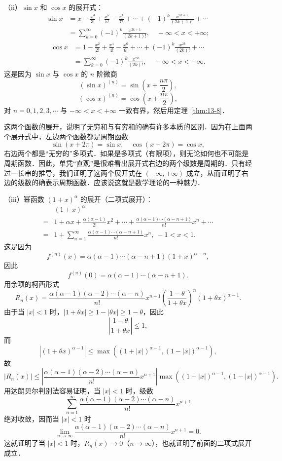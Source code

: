 （ii）$\sin x$ 和 $\cos x$ 的展开式：
\[
\begin{aligned}
\sin x&=x-\frac{x^{3}}{3!}+\frac{x^{5}}{5!}-\frac{x^{7}}{7!}+\cdots+(-1)^{k}\frac{x^{2k+1}}{(2k+1)!}+\cdots\\
&=\sum_{k=0}^{\infty}(-1)^{k}\frac{x^{2k+1}}{(2k+1)!},\quad -\infty<x<+\infty;
\end{aligned}
\]
\[
\begin{aligned}
\cos x&=1-\frac{x^{2}}{2!}+\frac{x^{4}}{4!}-\frac{x^{6}}{6!}+\cdots+(-1)^{k}\frac{x^{2k}}{(2k)!}+\cdots\\
&=\sum_{k=0}^{\infty}(-1)^{k}\frac{x^{2k}}{(2k)!},\quad -\infty<x<+\infty.
\end{aligned}
\]这是因为 $\sin x$ 与 $\cos x$ 的 $n$ 阶微商
\[
(\sin x)^{(n)}=\sin\left(x+\frac{n\pi}{2}\right),
\]
\[
(\cos x)^{(n)}=\cos\left(x+\frac{n\pi}{2}\right),
\]
对 $n=0,1,2,3,\cdots$ 与 $-\infty<x<+\infty$ 一致有界，然后用定理~\ref{thm:13-8}．

这两个函数的展开，说明了无穷和与有穷和的确有许多本质的区别．因为在上面两个展开式中，左边两个函数都是周期函数
\[
\sin(x+2\pi)=\sin x,\quad\cos(x+2\pi)=\cos x,
\]
右边两个都是``无穷的''多项式．如果是多项式（有限项），则无论如何也不可能是周期函数．因此，单凭``直观''是很难看出展开式右边的两个级数是周期的．只有经过一长串的推导，我们证明了这两个展开式在 $(-\infty,+\infty)$ 成立，从而证明了右边的级数的确表示周期函数．应该说这就是数学理论的一种魅力．

（iii）幂函数 $(1+x)^{\alpha}$ 的展开（二项式展开）：
\[
\begin{aligned}
&(1+x)^{\alpha}\\
={}&1+\alpha x+\frac{\alpha(\alpha-1)}{2!}x^{2}+\cdots+\frac{\alpha(\alpha-1)\cdots(\alpha-n+1)}{n!}x^{n}+\cdots\\
={}&1+\sum_{n=1}^{\infty}\frac{\alpha(\alpha-1)\cdots(\alpha-n+1)}{n!}x^{n},\ -1<x<1.
\end{aligned}
\]
这是因为
\[
f^{(n)}(x)=\alpha(\alpha-1)\cdots(\alpha-n+1)(1+x)^{\alpha-n},
\]
因此
\[
f^{(n)}(0)=\alpha(\alpha-1)\cdots(\alpha-n+1).
\]
用余项的柯西形式
\[
R_{n}(x)=\frac{\alpha(\alpha-1)(\alpha-2)\cdots(\alpha-n)}{n!}x^{n+1}\left(\frac{1-\theta}{1+\theta x}\right)^{n}(1+\theta x)^{\alpha-1}.
\]
由于当 $\left|x\right|<1$ 时，$\left|1+\theta x\right|\geqslant 1-\left|\theta x\right|\geqslant 1-\theta$，因此
\[
\left|\frac{1-\theta}{1+\theta x}\right|\leqslant 1,
\]
而
\[
\left|(1+\theta x)^{\alpha-1}\right|\leqslant\max\left(\left(1+\left|x\right|\right)^{\alpha-1},\left(1-\left|x\right|\right)^{\alpha-1}\right),
\]
故
\[
\left|R_{n}(x)\right|\leqslant\left|\frac{\alpha(\alpha-1)(\alpha-2)\cdots(\alpha-n)}{n!}x^{n+1}\right|\max\left(\left(1+\left|x\right|\right)^{\alpha-1},\left(1-\left|x\right|\right)^{\alpha-1}\right).
\]
用达朗贝尔判别法容易证明，当 $\left|x\right|<1$ 时，级数
\[
\sum_{n=1}^{\infty}\frac{\alpha(\alpha-1)(\alpha-2)\cdots(\alpha-n)}{n!}x^{n+1}
\]
绝对收敛，因而当 $\left|x\right|<1$ 时
\[
\lim_{n\to\infty}\frac{\alpha(\alpha-1)(\alpha-2)\cdots(\alpha-n)}{n!}x^{n+1}=0.
\]
这就证明了当 $\left|x\right|<1$ 时，$R_{n}(x)\to 0$（$n\to\infty$），也就证明了前面的二项式展开成立．

